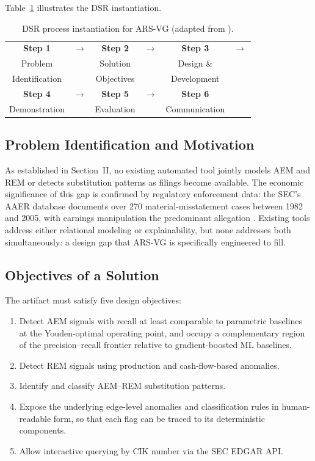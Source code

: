 \documentclass[12pt]{article}
\begin{document}
Table~\ref{tab:dsr} illustrates the DSR instantiation.

\begin{table}[tbp]
\centering
\caption{DSR process instantiation for ARS-VG (adapted from \citealt{peffers2007}).}
\label{tab:dsr}
\small
\begin{tabular}{cccccc}
\toprule
\textbf{Step 1} & $\boldsymbol{\rightarrow}$ &
\textbf{Step 2} & $\boldsymbol{\rightarrow}$ &
\textbf{Step 3} & $\boldsymbol{\rightarrow}$ \\
Problem & & Solution & & Design \& & \\
Identification & & Objectives & & Development & \\
\midrule
\textbf{Step 4} & $\boldsymbol{\rightarrow}$ &
\textbf{Step 5} & $\boldsymbol{\rightarrow}$ &
\textbf{Step 6} & \\
Demonstration & & Evaluation & & Communication & \\
\bottomrule
\end{tabular}
\end{table}

\subsection*{Problem Identification and Motivation}

As established in Section~II, no existing automated tool jointly
models AEM and REM or detects substitution patterns as filings become
available.  The
economic significance of this gap is confirmed by regulatory enforcement data:
the SEC's AAER database documents over 270 material-misstatement cases between
1982 and 2005, with earnings manipulation the predominant allegation
\citep{dechow2011}.  Existing tools address either relational modeling or
explainability, but none addresses both simultaneously: a design gap that
ARS-VG is specifically engineered to fill.

\subsection*{Objectives of a Solution}

The artifact must satisfy five design objectives:
\begin{enumerate}
    \item[(O1)] Detect AEM signals with recall at least comparable to
    parametric baselines at the Youden-optimal operating point, and
    occupy a complementary region of the precision--recall frontier
    relative to gradient-boosted ML baselines.
    \item[(O2)] Detect REM signals using production and cash-flow-based anomalies.
    \item[(O3)] Identify and classify AEM--REM substitution patterns.
    \item[(O4)] Expose the underlying edge-level anomalies and
    classification rules in human-readable form, so that each flag can
    be traced to its deterministic components.
    \item[(O5)] Allow interactive querying by CIK number via the SEC EDGAR API.
\end{enumerate}
\end{document}
